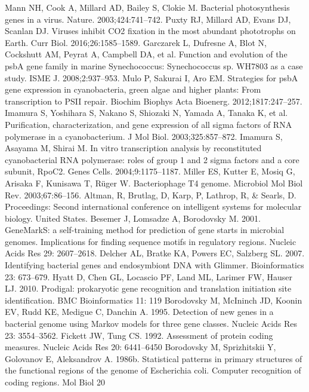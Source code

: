 \documentclass[14pt]{extarticle}
\begin{document}
\begin{thebibliography}{9}
     Mann NH, Cook A, Millard AD, Bailey S, Clokie M. Bacterial photosynthesis genes in a virus. Nature. 
    2003;424:741–742.
     Puxty RJ, Millard AD, Evans DJ, Scanlan DJ. Viruses inhibit CO2 fixation in the most abundant 
    phototrophs on Earth. Curr Biol. 2016;26:1585–1589.
     Garczarek L, Dufresne A, Blot N, Cockshutt AM, Peyrat A, Campbell DA, et al. Function and evolution of
    the psbA gene family in marine Synechococcus: Synechococcus sp. WH7803 as a case study. ISME J. 2008;2:937–953.
     Mulo P, Sakurai I, Aro EM. Strategies for psbA gene expression in cyanobacteria, green algae and 
    higher plants: From transcription to PSII repair. Biochim Biophys Acta Bioenerg. 2012;1817:247–257.
     Imamura S, Yoshihara S, Nakano S, Shiozaki N, Yamada A, Tanaka K, et al. Purification, 
    characterization, and gene expression of all sigma factors of RNA polymerase in a cyanobacterium. J Mol Biol. 
    2003;325:857–872.
     Imamura S, Asayama M, Shirai M. In vitro transcription analysis by reconstituted cyanobacterial RNA 
    polymerase: roles of group 1 and 2 sigma factors and a core subunit, RpoC2. Genes Cells. 2004;9:1175–1187.
     Miller ES, Kutter E, Mosiq G, Arisaka F, Kunisawa T, Rüger W. Bacteriophage T4 genome. Microbiol Mol 
    Biol Rev. 2003;67:86–156.
       Altman, R, Brutlag, D, Karp, P, Lathrop, R, \& Searls, D. Proceedings: Second international 
    conference on intelligent systems for molecular biology. United States. 
      Besemer J, Lomsadze A, Borodovsky M. 2001. GeneMarkS: a self-training method for prediction of 
    gene starts in microbial genomes. Implications for finding sequence motifs in regulatory regions. Nucleic Acids Res 
    29: 2607–2618.
     Delcher AL, Bratke KA, Powers EC, Salzberg SL. 2007. Identifying bacterial genes and endosymbiont 
    DNA with Glimmer. Bioinformatics 23: 673–679.
      Hyatt D, Chen GL, Locascio PF, Land ML, Larimer FW, Hauser LJ. 2010. Prodigal: prokaryotic gene 
    recognition and translation initiation site identification. BMC Bioinformatics 11: 119
      Borodovsky M, McIninch JD, Koonin EV, Rudd KE, Medigue C, Danchin A. 1995. Detection of new genes
    in a bacterial genome using Markov models for three gene classes. Nucleic Acids Res 23: 3554–3562.
     Fickett JW, Tung CS. 1992. Assessment of protein coding measures. Nucleic Acids Res 20: 6441–6450
     Borodovsky M, Sprizhitskii Y, Golovanov E, Aleksandrov A. 1986b. Statistical patterns in primary 
    structures of the functional regions of the genome of Escherichia coli. Computer recognition of coding regions. Mol 
    Biol 20
    
\end{thebibliography}
\end{document}
